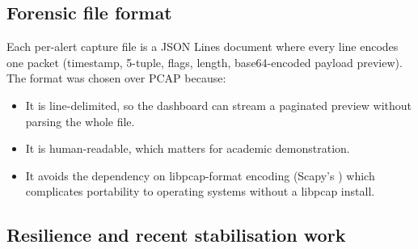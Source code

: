 \subsection{Forensic file format}

Each per-alert capture file is a JSON Lines document where every line
encodes one packet (timestamp, 5-tuple, flags, length, base64-encoded
payload preview). The format was chosen over PCAP because:
\begin{itemize}
    \item It is line-delimited, so the dashboard can stream a paginated
        preview without parsing the whole file.
    \item It is human-readable, which matters for academic demonstration.
    \item It avoids the dependency on libpcap-format encoding (Scapy's
        ) which complicates portability to operating
        systems without a libpcap install.
\end{itemize}

\subsection{Resilience and recent stabilisation work}

